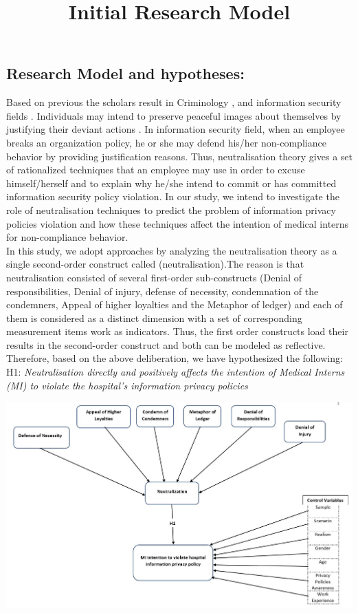 \subsection{Research Model and hypotheses:}
Based on previous the scholars result in Criminology  \cite{Sykes1957}, and information security fields \cite{Siponen2010,Teh2015,Kim2014}. Individuals may intend to preserve peaceful images about themselves by justifying their deviant actions \cite{Kim2014}. In information security field, when an employee breaks an organization policy, he or she may defend his/her non-compliance behavior by providing justification reasons. Thus, neutralisation theory gives a set of rationalized techniques that an employee may use in order to excuse himself/herself and to explain why he/she intend to commit or has committed information security policy violation. In our study, we intend to investigate the role of neutralisation techniques to predict the problem of information privacy policies violation and how these techniques affect the intention of medical interns for non-compliance behavior.\\
In this study, we adopt  \cite{Siponen2010,Teh2015} approaches by analyzing the neutralisation theory as a single second-order construct called (neutralisation).The reason is that neutralisation consisted of several first-order sub-constructs (Denial of responsibilities, Denial of injury, defense of necessity, condemnation of the condemners, Appeal of higher loyalties and the Metaphor of ledger) and each of them is considered as a distinct dimension with a set of corresponding measurement items work as indicators. Thus, the first order constructs load their results in the second-order construct and both can be modeled as reflective. Therefore, based on the above deliberation, we have hypothesized the following:
\\H1: \textit{ Neutralisation directly and positively affects the intention of Medical Interns (MI) to violate the hospital's information privacy policies   \textbf{}} 

\graphicspath{ {image/} }
\begin{center}
\includegraphics [scale=0.4]{Research_Model_Fv.JPG}
\end{center}
\begin{center}
\title{ Initial Research Model}
\end{center}

